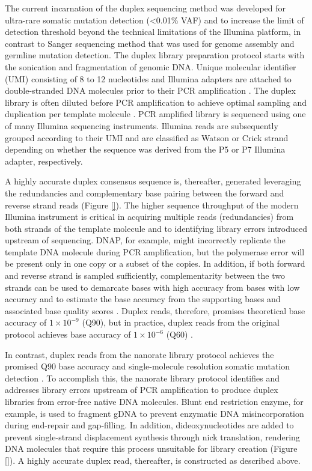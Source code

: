 The current incarnation of the duplex sequencing method was developed for ultra-rare somatic mutation detection (<0.01\% VAF) and to increase the limit of detection threshold beyond the technical limitations of the Illumina platform, in contrast to Sanger sequencing method that was used for genome assembly and germline mutation detection. The duplex library preparation protocol starts with the sonication and fragmentation of genomic DNA. Unique molecular identifier (UMI) consisting of 8 to 12 nucleotides and Illumina adapters are attached to double-stranded DNA molecules prior to their PCR amplification \cite{Schmitt2012-yr}. The duplex library is often diluted before PCR amplification to achieve optimal sampling and duplication per template molecule \cite{Hoang2016-jx, Abascal2021-pk}. PCR amplified library is sequenced using one of many Illumina sequencing instruments. Illumina reads are subsequently grouped according to their UMI and are classified as Watson or Crick strand depending on whether the sequence was derived from the P5 or P7 Illumina adapter, respectively. 

A highly accurate duplex consensus sequence is, thereafter, generated leveraging the redundancies and complementary base pairing between the forward and reverse strand reads (Figure \ref{}). The higher sequence throughput of the modern Illumina instrument is critical in acquiring multiple reads (redundancies) from both strands of the template molecule and to identifying library errors introduced upstream of sequencing. DNAP, for example, might incorrectly replicate the template DNA molecule during PCR amplification, but the polymerase error will be present only in one copy or a subset of the copies. In addition, if both forward and reverse strand is sampled sufficiently, complementarity between the two strands can be used to demarcate bases with high accuracy from bases with low accuracy \cite{Schmitt2012-yr} and to estimate the base accuracy from the supporting bases and associated base quality scores \cite{Abascal2021-pk}. Duplex reads, therefore, promises theoretical base accuracy of $1 \times 10^{-9}$ (Q90), but in practice, duplex reads from the original protocol achieves base accuracy of $1 \times 10^{-6}$ (Q60) \cite{Schmitt2012-yr}.

In contrast, duplex reads from the nanorate library protocol achieves the promised Q90 base accuracy and single-molecule resolution somatic mutation detection \cite{Abascal2021-pk}. To accomplish this, the nanorate library protocol identifies and addresses library errors upstream of PCR amplification to produce duplex libraries from error-free native DNA molecules. Blunt end restriction enzyme, for example, is used to fragment gDNA to prevent enzymatic DNA misincorporation during end-repair and gap-filling. In addition, dideoxynucleotides are added to prevent single-strand displacement synthesis through nick translation, rendering DNA molecules that require this process unsuitable for library creation (Figure \ref{}). A highly accurate duplex read, thereafter, is constructed as described above. 

